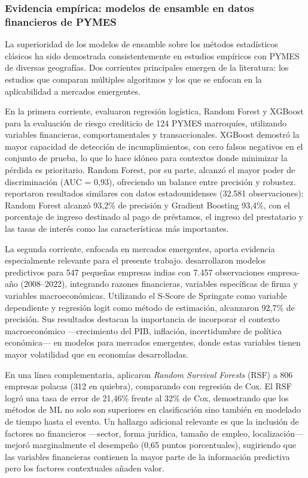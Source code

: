 \documentclass[12pt, letterpaper]{article}
\begin{document}
\subsubsection{Evidencia emp\'irica: modelos de ensamble en datos financieros de PYMES}

La superioridad de los modelos de ensamble sobre los m\'etodos estad\'isticos cl\'asicos ha sido demostrada consistentemente en estudios emp\'iricos con PYMES de diversas geograf\'ias. Dos corrientes principales emergen de la literatura: los estudios que comparan m\'ultiples algoritmos y los que se enfocan en la aplicabilidad a mercados emergentes.

En la primera corriente, \citet{Boumhidi2025} evaluaron regresi\'on log\'istica, Random Forest y XGBoost para la evaluaci\'on de riesgo crediticio de 124 PYMES marroqu\'ies, utilizando variables financieras, comportamentales y transaccionales. XGBoost demostr\'o la mayor capacidad de detecci\'on de incumplimientos, con cero falsos negativos en el conjunto de prueba, lo que lo hace id\'oneo para contextos donde minimizar la p\'erdida es prioritario. Random Forest, por su parte, alcanz\'o el mayor poder de discriminaci\'on (AUC = 0,93), ofreciendo un balance entre precisi\'on y robustez. \citet{Yufenyuy2024} reportaron resultados similares con datos estadounidenses (32.581 observaciones): Random Forest alcanz\'o 93,2\% de precisi\'on y Gradient Boosting 93,4\%, con el porcentaje de ingreso destinado al pago de pr\'estamos, el ingreso del prestatario y las tasas de inter\'es como las caracter\'isticas m\'as importantes.

La segunda corriente, enfocada en mercados emergentes, aporta evidencia especialmente relevante para el presente trabajo. \citet{Mahesh2025} desarrollaron modelos predictivos para 547 peque\~nas empresas indias con 7.457 observaciones empresa-a\~no (2008--2022), integrando razones financieras, variables espec\'ificas de firma y variables macroecon\'omicas. Utilizando el S-Score de Springate como variable dependiente y regresi\'on logit como m\'etodo de estimaci\'on, alcanzaron 92,7\% de precisi\'on. Sus resultados destacan la importancia de incorporar el contexto macroecon\'omico ---crecimiento del PIB, inflaci\'on, incertidumbre de pol\'itica econ\'omica--- en modelos para mercados emergentes, donde estas variables tienen mayor volatilidad que en econom\'ias desarrolladas.

En una l\'inea complementaria, \citet{PtakChmielewska2020} aplicaron \textit{Random Survival Forests} (RSF) a 806 empresas polacas (312 en quiebra), comparando con regresi\'on de Cox. El RSF logr\'o una tasa de error de 21,46\% frente al 32\% de Cox, demostrando que los m\'etodos de ML no solo son superiores en clasificaci\'on sino tambi\'en en modelado de tiempo hasta el evento. Un hallazgo adicional relevante es que la inclusi\'on de factores no financieros ---sector, forma jur\'idica, tama\~no de empleo, localizaci\'on--- mejor\'o marginalmente el desempe\~no (0,65 puntos porcentuales), sugiriendo que las variables financieras contienen la mayor parte de la informaci\'on predictiva pero los factores contextuales a\~naden valor.
\end{document}
